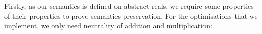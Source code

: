 Firstly, as our semantics is defined on abstract reals, we require some
properties of their properties to prove semantics preservation.
For the optimisations that we implement,
we only need neutrality of addition and multiplication:
\begin{code}[hide]%
\>[0]\AgdaSpace{}%
\AgdaSpace{}%
\<%
\\
\>[0][@{}l@{\AgdaIndent{0}}]%
\>[2]\AgdaSpace{}%
\AgdaSpace{}%
\AgdaSpace{}%
\AgdaSpace{}%
\AgdaSpace{}%
\AgdaSpace{}%
\AgdaSymbol{(}\AgdaSymbol{;}\AgdaSpace{}%
\AgdaSymbol{;}\AgdaSpace{}%
\AgdaSymbol{)}\<%
\\
%
\>[2]\AgdaSpace{}%
\AgdaSpace{}%
\<%
\\
%
\>[2]\AgdaSpace{}%
\<%
\\
%
\>[2]\AgdaSpace{}%
\<%
\end{code}
